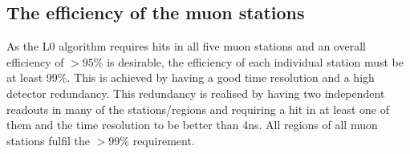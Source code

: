 \subsection{The efficiency of the muon stations}
As the L0 algorithm requires hits in all five muon stations and an overall efficiency of $>95$\% is desirable, the efficiency of each individual station must be at least 99\%. This is achieved by having a good time resolution and a high detector redundancy. This redundancy is realised by having two independent readouts in many of the stations/regions and requiring a hit in at least one of them and the time resolution to be better than 4ns. All regions of all muon stations fulfil the $>99$\% requirement. %





